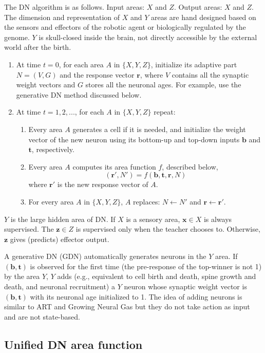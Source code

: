 \documentclass[conference]{IEEEtran}
\def\b{\mathbf b}
\def\r{\mathbf r}
\def\t{\mathbf t}
\def\x{\mathbf x}
\def\z{\mathbf z}
\begin{document}
The DN algorithm is as follows.  
Input areas: $X$ and $Z$.  Output areas: $X$ and $Z$.   The dimension and representation of $X$ and $Y$ areas are hand designed based on the sensors and effectors of the robotic agent or biologically regulated by the genome.   
$Y$ is skull-closed inside the brain, not directly accessible  by the external world after the birth.     
\begin{enumerate}
\item At time $t=0$, for each area $A$ in $\{X, Y, Z\}$, initialize 
its adaptive part $N=(V, G)$ and the response vector $\r$, where $V$ contains all the synaptic weight vectors and $G$ stores all the neuronal ages.   For example, use the generative DN method discussed below. 
\item At time $t=1, 2, ... $, for each $A$ in $\{X, Y, Z\}$ repeat: 
\begin{enumerate}
\item Every area $A$ generates a cell if it is needed, and initialize the weight vector of the new neuron using its bottom-up and top-down inputs $\b$ and $\t$, respectively.
\item Every area $A$ computes its area function $f$, described below, 
\[
(\r', N') = f(\b, \t, \r, N)
\]
where $\r'$ is the new response vector of $A$.  
\item For every area $A$ in $\{X, Y, Z\}$, $A$ replaces: $N\leftarrow N'$ and $\r \leftarrow \r'$.
\end{enumerate}
\end{enumerate}

$Y$ is the large hidden area of DN.  If $X$ is a sensory area, $\x \in X$ is always supervised.   
The $\z \in Z$ is supervised only when the 
teacher chooses to.   Otherwise, $\z$ gives (predicts) effector output.  

A generative DN (GDN) automatically generates neurons in the $Y$ area.  If $(\b, \t)$ is observed for the first time (the pre-response of the top-winner is not 1) by 
the area $Y$, $Y$ adds (e.g., equivalent to cell birth and death, spine growth and death, and neuronal recruitment) a $Y$ neuron whose synaptic weight vector is 
$(\b, \t)$ with its neuronal age initialized to 1.   The idea of adding neurons is similar to ART and Growing Neural Gas but they do not take action as input and are not state-based. 

\subsection{Unified DN area function}
\end{document}
